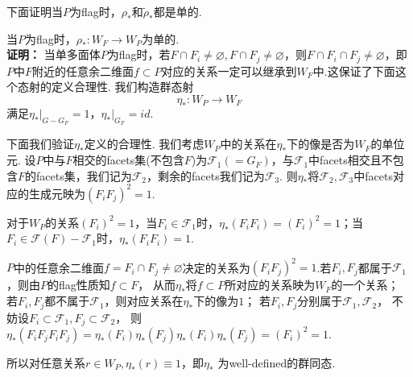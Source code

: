 \documentclass{article}
\theoremstyle{plain}%
\theoremstyle{definition}
\theoremstyle{remark}
\begin{document}




下面证明当$P$为flag时，$\rho_{*}$和$\widetilde{\rho}_*$都是单的.


{\lem 当$P$为flag时，$\rho_{*}:W_F\longrightarrow W_P$为单的.}\\
{\bf 证明：}
当单多面体$P$为flag时，若$F\cap F_i\neq \varnothing, F\cap F_j\neq \varnothing$，则$F\cap F_i\cap F_j\neq \varnothing$，即$P$中$F$附近的任意余二维面$f\subset P$对应的关系一定可以继承到$W_F$中.这保证了下面这个态射的定义合理性.
我们构造群态射
\begin{equation}\label{eq7}
\eta_{*}:W_P\longrightarrow W_F
\end{equation}
满足$\eta_{*}|_{G-G_F}=1$，$\eta_{*}|_{G_F}=id$. 

下面我们验证$\eta_{*}$定义的合理性. 我们考虑$W_P$中的关系在$\eta_{*}$下的像是否为$W_F$的单位元. 
设$P$中与$F$相交的facets集(不包含$F$)为$\mathcal{F}_1(=G_F)$，与$\mathcal{F}_1$中facets相交且不包含$F$的facets集，我们记为$\mathcal{F}_2$，剩余的facets我们记为$\mathcal{F}_3$.  
则$\eta_{*}$将$\mathcal{F}_2, \mathcal{F}_3$中facets对应的生成元映为$(F_iF_j)^2=1$.

对于$W_P$的关系$(F_i)^2=1$，当$F_i\in \mathcal{F}_1$时，$\eta_{*}(F_iF_i)=(F_i)^2=1$；当$F_i\in \mathcal{F}(F)-\mathcal{F}_1$时，$\eta_{*}(F_iF_i)=1$. 

$P$中的任意余二维面$f=F_{i}\cap F_{j}\neq\varnothing$决定的关系为$(F_iF_j)^2=1$.若$F_{i},F_{j}$都属于$\mathcal{F}_1$，则由$P$的flag性质知$f\subset F$，
从而$\eta_{*}$将$f\subset P$所对应的关系映为$W_F$的一个关系；
若$F_{i},F_{j}$都不属于$\mathcal{F}_1$，则对应关系在$\eta_{*}$下的像为$1$；
若$F_{i},F_{j}$分别属于$\mathcal{F}_1,\mathcal{F}_2$，
不妨设$F_{i}\subset \mathcal{F}_1,F_{j}\subset \mathcal{F}_2$，
则$\eta_{*}(F_iF_jF_iF_j)=\eta_{*}(F_i)\eta_{*}(F_j)\eta_{*}(F_i)\eta_{*}(F_j)=(F_i)^2=1$. 

所以对任意关系$r\in W_P,\eta_{*}(r)\equiv 1$，即$\eta_{*}$ 为well-defined的群同态.
\end{document}
